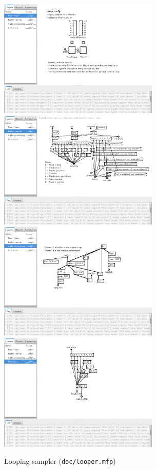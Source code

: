 \documentclass[11pt,a4paper]{article}
\begin{document}
\begin{figure}
    \includegraphics[width=3in]{looper-front.png}
    \includegraphics[width=3in]{looper-buffer.png}
    \includegraphics[width=3in]{looper-audio.png}
    \includegraphics[width=3in]{looper-indicators.png}
    \caption{Looping sampler (\texttt{doc/looper.mfp})}
\end{figure}
\end{document}
